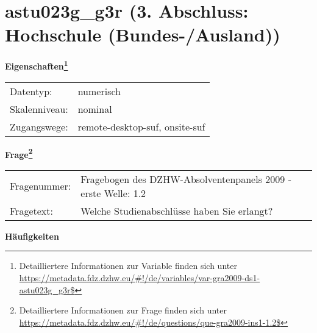 
    \setcounter{footnote}{0}

    \vspace*{-1.8cm}
	\section{astu023g\_g3r (3. Abschluss: Hochschule (Bundes-/Ausland))}
	\label{section:astu023g_g3r}



    \vspace*{0.5cm}
    \noindent\textbf{Eigenschaften\footnote{Detailliertere Informationen zur Variable finden sich unter
		\url{https://metadata.fdz.dzhw.eu/\#!/de/variables/var-gra2009-ds1-astu023g_g3r$}}}\\
	\begin{tabularx}{\hsize}{@{}lX}
	Datentyp: & numerisch \\
	Skalenniveau: & nominal \\
	Zugangswege: &
	  remote-desktop-suf, 
	  onsite-suf
 \\
    \end{tabularx}



				\vspace*{0.5cm}
                \noindent\textbf{Frage\footnote{Detailliertere Informationen zur Frage finden sich unter
		              \url{https://metadata.fdz.dzhw.eu/\#!/de/questions/que-gra2009-ins1-1.2$}}}\\
				\begin{tabularx}{\hsize}{@{}lX}
					Fragenummer: &
					  Fragebogen des DZHW-Absolventenpanels 2009 - erste Welle:
					  1.2
 \\
					Fragetext: & Welche Studienabschlüsse haben Sie erlangt? \\
				\end{tabularx}





        		\vspace*{0.5cm}
                \noindent\textbf{Häufigkeiten}


